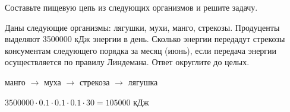 
Составьте пищевую цепь из следующих организмов и решите задачу.

Даны следующие организмы: лягушки, мухи, манго, стрекозы. Продуценты выделяют 3500000 кДж энергии в день. 
Сколько энергии передадут стрекозы консументам следующего порядка за месяц (июнь), 
если передача энергии осуществляется по правилу Линдемана. Ответ округлите до целых.

\solutionSection

манго $\rightarrow$ муха $\rightarrow$ стрекоза $\rightarrow$ лягушка

$3500000 \cdot 0.1 \cdot 0.1  \cdot 0.1 \cdot 30 = 105000$ кДж

